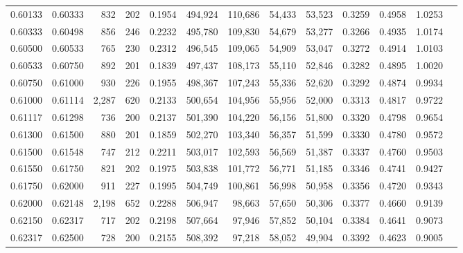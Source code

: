 \begin{tabular}{rrrrrrrrrrrrr}
0.60133 & 0.60333 &   832 & 202 &                                     0.1954 & 494,924 & 110,686 &  54,433 &  53,523 & 0.3259 & 0.4958 & 1.0253 \\
0.60333 & 0.60498 &   856 & 246 &                                     0.2232 & 495,780 & 109,830 &  54,679 &  53,277 & 0.3266 & 0.4935 & 1.0174 \\
0.60500 & 0.60533 &   765 & 230 &                                     0.2312 & 496,545 & 109,065 &  54,909 &  53,047 & 0.3272 & 0.4914 & 1.0103 \\
0.60533 & 0.60750 &   892 & 201 &                                     0.1839 & 497,437 & 108,173 &  55,110 &  52,846 & 0.3282 & 0.4895 & 1.0020 \\
0.60750 & 0.61000 &   930 & 226 &                                     0.1955 & 498,367 & 107,243 &  55,336 &  52,620 & 0.3292 & 0.4874 & 0.9934 \\
0.61000 & 0.61114 & 2,287 & 620 &                                     0.2133 & 500,654 & 104,956 &  55,956 &  52,000 & 0.3313 & 0.4817 & 0.9722 \\
0.61117 & 0.61298 &   736 & 200 &                                     0.2137 & 501,390 & 104,220 &  56,156 &  51,800 & 0.3320 & 0.4798 & 0.9654 \\
0.61300 & 0.61500 &   880 & 201 &                                     0.1859 & 502,270 & 103,340 &  56,357 &  51,599 & 0.3330 & 0.4780 & 0.9572 \\
0.61500 & 0.61548 &   747 & 212 &                                     0.2211 & 503,017 & 102,593 &  56,569 &  51,387 & 0.3337 & 0.4760 & 0.9503 \\
0.61550 & 0.61750 &   821 & 202 &                                     0.1975 & 503,838 & 101,772 &  56,771 &  51,185 & 0.3346 & 0.4741 & 0.9427 \\
0.61750 & 0.62000 &   911 & 227 &                                     0.1995 & 504,749 & 100,861 &  56,998 &  50,958 & 0.3356 & 0.4720 & 0.9343 \\
0.62000 & 0.62148 & 2,198 & 652 &                                     0.2288 & 506,947 &  98,663 &  57,650 &  50,306 & 0.3377 & 0.4660 & 0.9139 \\
0.62150 & 0.62317 &   717 & 202 &                                     0.2198 & 507,664 &  97,946 &  57,852 &  50,104 & 0.3384 & 0.4641 & 0.9073 \\
0.62317 & 0.62500 &   728 & 200 &                                     0.2155 & 508,392 &  97,218 &  58,052 &  49,904 & 0.3392 & 0.4623 & 0.9005 \\

\end{tabular}
